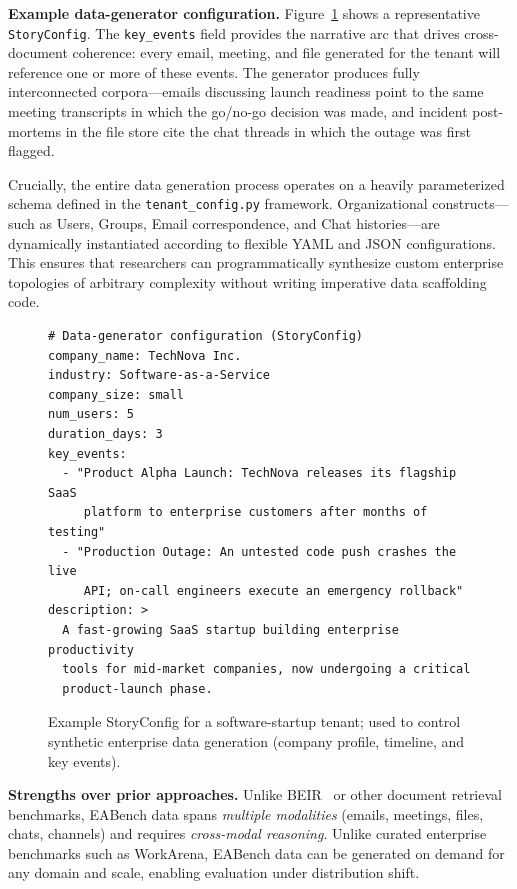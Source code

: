 \documentclass[journal,dvipsnames]{acmart}
\begin{document}
\textbf{Example data-generator configuration.}
Figure~\ref{lst:storyconfig} shows a representative \texttt{StoryConfig}.
The \texttt{key\_events} field provides the narrative arc that drives
cross-document coherence: every email, meeting, and file generated for
the tenant will reference one or more of these events.
The generator produces fully interconnected corpora---emails discussing
launch readiness point to the same meeting transcripts in which
the go/no-go decision was made, and incident post-mortems in the file
store cite the chat threads in which the outage was first flagged.

Crucially, the entire data generation process operates on a heavily parameterized schema defined in the \texttt{tenant\_config.py} framework. Organizational constructs---such as Users, Groups, Email correspondence, and Chat histories---are dynamically instantiated according to flexible YAML and JSON configurations. This ensures that researchers can programmatically synthesize custom enterprise topologies of arbitrary complexity without writing imperative data scaffolding code.

\begin{figure}[h]
  \centering
  
\begin{minipage}{0.9\textwidth}
\begin{lstlisting}
# Data-generator configuration (StoryConfig)
company_name: TechNova Inc.
industry: Software-as-a-Service
company_size: small
num_users: 5
duration_days: 3
key_events:
  - "Product Alpha Launch: TechNova releases its flagship SaaS
     platform to enterprise customers after months of testing"
  - "Production Outage: An untested code push crashes the live
     API; on-call engineers execute an emergency rollback"
description: >
  A fast-growing SaaS startup building enterprise productivity
  tools for mid-market companies, now undergoing a critical
  product-launch phase.
  \end{lstlisting}
\end{minipage}

  \caption{Example StoryConfig for a software-startup tenant; used to control synthetic enterprise data generation (company profile, timeline, and key events).}
  \label{lst:storyconfig}
\end{figure}

\textbf{Strengths over prior approaches.}
Unlike BEIR~\cite{thakur2021beir} or other document retrieval benchmarks,
EABench data spans \emph{multiple modalities} (emails, meetings, files, chats,
channels) and requires \emph{cross-modal reasoning}.  Unlike curated enterprise
benchmarks such as WorkArena, EABench data can be generated on demand for any
domain and scale, enabling evaluation under distribution shift.
\end{document}
